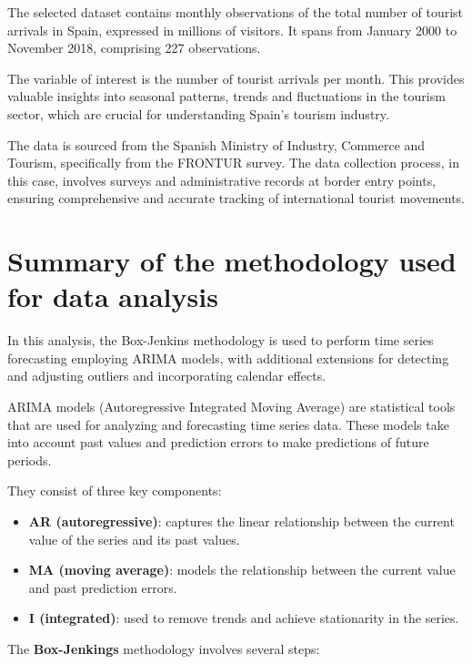 \documentclass[
]{article}
\begin{document}
The selected dataset contains monthly observations of the total number
of tourist arrivals in Spain, expressed in millions of visitors. It
spans from January 2000 to November 2018, comprising 227 observations.

The variable of interest is the number of tourist arrivals per month.
This provides valuable insights into seasonal patterns, trends and
fluctuations in the tourism sector, which are crucial for understanding
Spain's tourism industry.

The data is sourced from the Spanish Ministry of Industry, Commerce and
Tourism, specifically from the FRONTUR survey. The data collection
process, in this case, involves surveys and administrative records at
border entry points, ensuring comprehensive and accurate tracking of
international tourist movements. \newpage

\hypertarget{summary-of-the-methodology-used-for-data-analysis}{%
\section{Summary of the methodology used for data
analysis}\label{summary-of-the-methodology-used-for-data-analysis}}

In this analysis, the Box-Jenkins methodology is used to perform time
series forecasting employing ARIMA models, with additional extensions
for detecting and adjusting outliers and incorporating calendar effects.

ARIMA models (Autoregressive Integrated Moving Average) are statistical
tools that are used for analyzing and forecasting time series data.
These models take into account past values and prediction errors to make
predictions of future periods.

They consist of three key components:

\begin{itemize}
\item
  \textbf{AR (autoregressive)}: captures the linear relationship between
  the current value of the series and its past values.
\item
  \textbf{MA (moving average)}: models the relationship between the
  current value and past prediction errors.
\item
  \textbf{I (integrated)}: used to remove trends and achieve
  stationarity in the series.
\end{itemize}

The \textbf{Box-Jenkings} methodology involves several steps:
\end{document}
